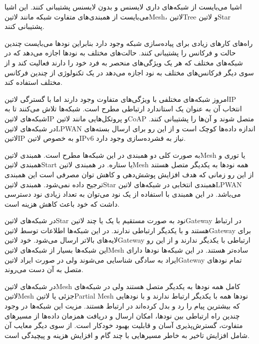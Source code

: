 
اشیا می‌بایست از شبکه‌های داری لایسنس و بدون لایسنس پشتیبانی کنند.
این اشیا می‌بایست از همبندی‌های متفاوت شبکه مانند ‌لاتین{Mesh}، ‌لاتین{Tree} و ‌لاتین{Star} پشتیبانی کنند.

راه‌های کارهای زیادی برای پیاده‌سازی شبکه وجود دارد بنابراین نودها می‌بایست چندین حالت و فرکانس را پشتیبانی کنند.
حالت‌های مختلف به نودها اجازه می‌دهد که در شبکه‌های مختلف که هر یک ویژگی‌های منحصر به فرد خود را دارند
فعالیت کند و از سوی دیگر فرکانس‌های مختلف به نود اجازه می‌دهد در یک تکنولوژی از چندین فرکانس مختلف استفاده کند.


امروز شبکه‌های مختلفی با ویژگی‌های متفاوت وجود دارند اما با گسترگی ‌لاتین{IP} انتخاب آن به عنوان
یک استاندارد ارتباطی مطرح است. شبکه‌ها تلاش می‌کنند تا به شبکه‌های ‌لاتین{IP} و پروتکل‌هایی مانند
‌لاتین{CoAP} متصل شوند و آن‌ها را پشتیبانی کنند.
در شبکه‌های ‌لاتین{LPWAN} اندازه داده‌ها کوچک است و از این رو برای ارسال بسته‌های ‌لاتین{IP} و
به خصوص ‌لاتین{IPv6} نیاز به فشرده‌سازی وجود دارد.


به صورت کلی دو همبندی در این شبکه‌ها مطرح است. همبندی ‌لاتین{Mesh} یا توری
و همبندی ‌لاتین{Start} یا ستاره.
در همبندی ‌لاتین{Mesh} همه نودها به یکدیگر متصل هستند از این رو زمانی که هدف
افزایش پوشش‌دهی و کاهش توان مصرفی است این همبندی ترجیح داده نمی‌شود. همبندی
‌لاتین{Star} همبندی انتخابی در شبکه‌های ‌لاتین{LPWAN} می‌باشد.
در این همبندی با استفاده از یک نود می‌توان به تعداد زیادی نود دسترسی داشت که
خود باعث کاهش هزینه است.

در شبکه‌های ‌لاتین{Star} نود به صورت مستقیم با یک یا چند ‌لاتین{Gateway} در ارتباط هستند
و با یکدیگر ارتباطی ندارند. در این شبکه‌ها اطلاعات توسط ‌لاتین{Gateway} برای لایه‌های بالاتر ارسال می‌شود.
خود ‌لاتین{Gateway} ارتباطی با یکدیگر ندارند و از این رو این شبکه‌ها بسیار از شبکه‌های ‌لاتین{Mesh} ساده‌تر هستند.
در این شبکه‌ها نودها دارای ایراد به سادگی شناسایی می‌شوند ولی در صورت ایراد ‌لاتین{Gateway} تمام نودهای
متصل به آن دست می‌روند.

در شبکه‌های ‌لاتین{Mesh} کامل همه نودها به یکدیگر متصل هستند ولی در شبکه‌های ‌لاتین{Mesh} جزئی یا ‌لاتین{Partial Mesh} نودها
همه با یکدیگر ارتباط ندارند و با نودهایی که بیشترین پیام را رد و بدل کرده‌اند در ارتباط هستند.
مزیت این شبکه‌ها در وجود چندین راه ارتباطی بین نودها، امکان ارسال و دریافت همزمان داده‌ها از مسیرهای متفاوت،
گسترش‌پذیری آسان و قابلیت بهبود خودکار است. از سوی دیگر معایب آن شامل افزایش تاخیر به خاطر مسیرهایی با چند گام و
افزایش هزینه و پیچیدگی است.

